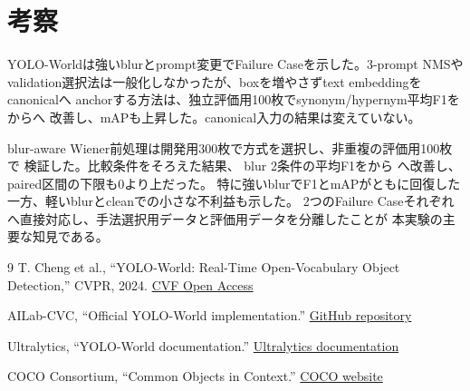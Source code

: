 \documentclass[lualatex,ja=standard,a4paper,10pt]{bxjsarticle}
\begin{document}
\section{考察}

YOLO-Worldは強いblurとprompt変更でFailure Caseを示した。3-prompt NMSや
validation選択法は一般化しなかったが、boxを増やさずtext embeddingをcanonicalへ
anchorする方法は、独立評価用100枚でsynonym/hypernym平均F1を
\PromptPrototypeBaselineTargetMeanFOne から\PromptPrototypeImprovedTargetMeanFOne へ
改善し、mAPも上昇した。canonical入力の結果は変えていない。

blur-aware Wiener前処理は開発用300枚で方式を選択し、非重複の評価用100枚で
検証した。比較条件をそろえた結果、
blur 2条件の平均F1を\SameModelBaselineBlurMeanFOne から
\SameModelImprovedBlurMeanFOne へ改善し、paired区間の下限も0より上だった。
特に強いblurでF1とmAPがともに回復した一方、軽いblurとcleanでの小さな不利益も示した。
2つのFailure Caseそれぞれへ直接対応し、手法選択用データと評価用データを分離したことが
本実験の主要な知見である。

\footnotesize
\begin{thebibliography}{9}
\setlength{\itemsep}{0pt}
\setlength{\parskip}{0pt}
T. Cheng et al.,
``YOLO-World: Real-Time Open-Vocabulary Object Detection,''
CVPR, 2024.
\href{https://openaccess.thecvf.com/content/CVPR2024/html/Cheng_YOLO-World_Real-Time_Open-Vocabulary_Object_Detection_CVPR_2024_paper.html}{CVF Open Access}

AILab-CVC,
``Official YOLO-World implementation.''
\href{https://github.com/AILab-CVC/YOLO-World}{GitHub repository}

Ultralytics,
``YOLO-World documentation.''
\href{https://docs.ultralytics.com/models/yolo-world/}{Ultralytics documentation}

COCO Consortium,
``Common Objects in Context.''
\href{https://cocodataset.org/}{COCO website}
\end{thebibliography}
\end{document}
